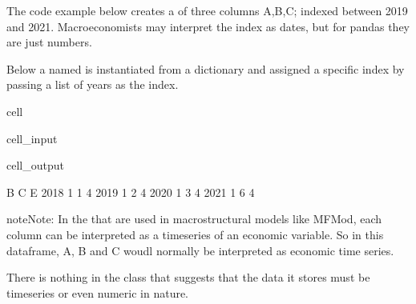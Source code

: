 \documentclass[letterpaper,10pt,english]{jupyterBook}
\begin{document}
\sphinxAtStartPar
The code example below creates a  of three columns A,B,C; indexed between 2019 and 2021.  Macroeconomists may interpret the index as dates, but for pandas they are just numbers.

\sphinxAtStartPar
Below a  named  is instantiated from a dictionary and assigned a specific index by passing a list of years as the index.

\begin{sphinxuseclass}{cell}\begin{sphinxVerbatimInput}

\begin{sphinxuseclass}{cell_input}
\begin{sphinxVerbatim}[commandchars=\\\{\}]
   \PYG{p}{[}\PYG{p}{]}\PYG{p}{[}\PYG{p}{]}\PYG{p}{[}\PYG{p}{]}\PYG{p}{[}\PYG{p}{]}
\end{sphinxVerbatim}

\end{sphinxuseclass}\end{sphinxVerbatimInput}
\begin{sphinxVerbatimOutput}

\begin{sphinxuseclass}{cell_output}
\begin{sphinxVerbatim}[commandchars=\\\{\}]
      B  C  E
2018  1  1  4
2019  1  2  4
2020  1  3  4
2021  1  6  4
\end{sphinxVerbatim}

\end{sphinxuseclass}\end{sphinxVerbatimOutput}

\end{sphinxuseclass}
\begin{sphinxadmonition}{note}{Note:}
\sphinxAtStartPar
In the  that are used in macrostructural models like MFMod, each  column can be interpreted as a time\sphinxhyphen{}series of an economic variable. So in this dataframe,  A, B and C woudl normally be interpreted as economic time series.

\sphinxAtStartPar
There is nothing in the  class that suggests that the data it stores must be time\sphinxhyphen{}series or even numeric in nature.
\end{sphinxadmonition}
\end{document}
